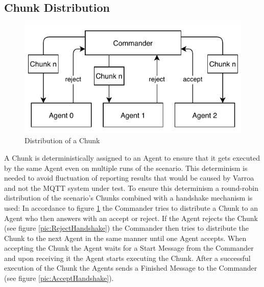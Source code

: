\subsection{Chunk Distribution}\label{sec:chunkDistribution}
\begin{figure}[h]
	\begin{center}
	\includegraphics[scale=1.2]{Resources/PDF/ChunkDistribution}
	\caption{Distribution of a Chunk}
	\label{pic:ChunkDistribution}
	\end{center}
\end{figure}
A Chunk is deterministically assigned to an Agent to ensure that it gets executed by the same Agent even on multiple runs of the scenario. This determinism is needed to avoid fluctuation of reporting results that would be caused by Varroa and not the MQTT system under test.
To ensure this determinism a round-robin distribution of the scenario's Chunks combined with a handshake mechanism is used:
In accordance to figure \ref{pic:ChunkDistribution} the Commander tries to distribute a Chunk to an Agent who then answers with an accept or reject.
If the Agent rejects the Chunk (see figure \ref{pic:RejectHandshake}) the Commander then tries to distribute the Chunk to the next Agent in the same manner until one Agent accepts.
When accepting the Chunk the Agent waits for a Start Message from the Commander and upon receiving it the Agent starts executing the Chunk.
After a successful execution of the Chunk the Agents sends a Finished Message to the Commander (see figure \ref{pic:AcceptHandshake}).


